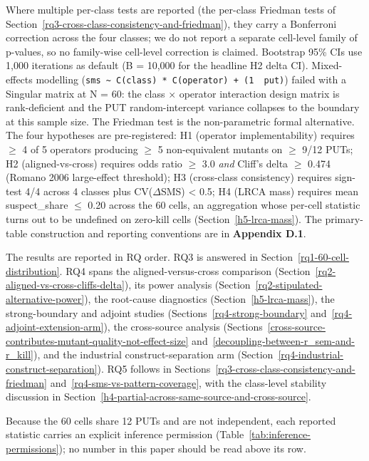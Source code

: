 \documentclass[manuscript,screen,review]{acmart}
\begin{document}
Where multiple per-class tests are reported (the per-class Friedman tests
of Section~\ref{rq3-cross-class-consistency-and-friedman}), they carry a Bonferroni correction across the four classes; we
do not report a separate cell-level family of p-values, so no family-wise
cell-level correction is claimed. Bootstrap 95\% CIs use 1,000 iterations
as default (B = 10,000 for the headline H2 delta CI). Mixed-effects
modelling
(\texttt{sms\ \textasciitilde{}\ C(class)\ *\ C(operator)\ +\ (1\ \textbar{}\ put)})
failed with a Singular matrix at N = 60: the class $\times$ operator
interaction design matrix is rank-deficient and the PUT random-intercept
variance collapses to the boundary at this sample size. The Friedman test
is the non-parametric formal alternative. The four hypotheses are
pre-registered: H1 (operator implementability) requires $\geq$ 4 of 5
operators producing $\geq$ 5 non-equivalent mutants on $\geq$ 9/12 PUTs; H2
(aligned-vs-cross) requires odds ratio $\geq$ 3.0 \emph{and} Cliff's delta $\geq$
0.474 (Romano 2006 large-effect threshold); H3 (cross-class consistency)
requires sign-test 4/4 across 4 classes plus CV($\Delta$SMS) \textless{} 0.5;
H4 (LRCA mass) requires mean suspect\_share $\leq$ 0.20 across the 60
cells, an aggregation whose per-cell statistic turns out to be undefined
on zero-kill cells (Section~\ref{h5-lrca-mass}). The primary-table
construction and reporting conventions are in
\textbf{Appendix D.1}.

The results are reported in RQ order. RQ3 is answered in
Section~\ref{rq1-60-cell-distribution}. RQ4 spans the aligned-versus-cross
comparison (Section~\ref{rq2-aligned-vs-cross-cliffs-delta}), its power
analysis (Section~\ref{rq2-stipulated-alternative-power}), the root-cause
diagnostics (Section~\ref{h5-lrca-mass}), the strong-boundary and adjoint
studies (Sections~\ref{rq4-strong-boundary} and~\ref{rq4-adjoint-extension-arm}),
the cross-source analysis
(Sections~\ref{cross-source-contributes-mutant-quality-not-effect-size}
and~\ref{decoupling-between-r_sem-and-r_kill}), and the industrial
construct-separation arm
(Section~\ref{rq4-industrial-construct-separation}). RQ5 follows in
Sections~\ref{rq3-cross-class-consistency-and-friedman}
and~\ref{rq4-sms-vs-pattern-coverage}, with the class-level stability
discussion in Section~\ref{h4-partial-across-same-source-and-cross-source}.

Because the 60 cells share 12 PUTs and are not independent, each
reported statistic carries an explicit inference permission
(Table~\ref{tab:inference-permissions}); no number in this paper should
be read above its row.
\end{document}
